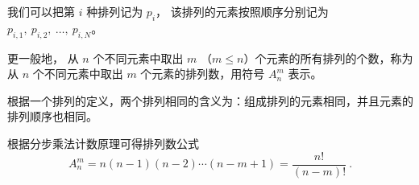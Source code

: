 我们可以把第 $i$ 种排列记为 $p_i$， 该排列的元素按照顺序分别记为 $p_{i,1},\ p_{i,2},\ \dots, \ p_{i,N}$。

更一般地， 从 $n$ 个不同元素中取出 $m$ （$m \leq n$）个元素的所有排列的个数，称为从 $n$ 个不同元素中取出 $m$ 个元素的排列数，用符号 $A_n^m$ 表示。

根据一个排列的定义，两个排列相同的含义为：组成排列的元素相同，并且元素的排列顺序也相同。

根据分步乘法计数原理可得排列数公式
\begin{equation}\label{eq_permut_1}
A_n^m = n (n - 1)(n - 2) \cdots (n - m + 1) =\frac{n!}{(n - m)!}~.
\end{equation}

